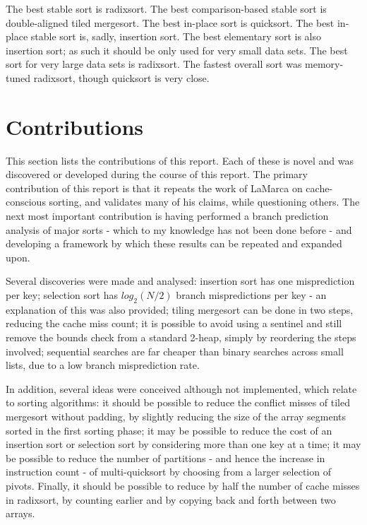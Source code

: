The best stable sort is radixsort. The best comparison-based stable sort is
double-aligned tiled mergesort. The best in-place sort is quicksort. The best in-place
stable sort is, sadly, insertion sort. The best elementary sort is also
insertion sort; as such it should be only used for very small data sets.  The
best sort for very large data sets is radixsort. The fastest overall sort was
memory-tuned radixsort, though quicksort is very close.

\section{Contributions}

This section lists the contributions of this report. Each of these is novel  
and was discovered or developed during the course of this report.
The primary contribution of this report is that it repeats the work of LaMarca
on cache-conscious sorting, and validates many of his claims, while questioning
others. The next most important contribution is having performed a branch
prediction analysis of major sorts - which to my knowledge has not been done
before - and developing a framework by which these results can be repeated and
expanded upon.


Several discoveries were made and analysed: insertion sort has one misprediction
per key; selection sort has $log_2(N/2)$ branch mispredictions per key - an
explanation of this was also provided; tiling mergesort can be done in two
steps, reducing the cache miss count; it is possible to avoid using a
sentinel and still remove the bounds check from a standard 2-heap, simply by
reordering the steps involved; sequential searches are far cheaper than binary
searches across small lists, due to a low branch misprediction rate.



In addition, several ideas were conceived although not implemented, which relate
to sorting algorithms: it should be possible to reduce the conflict misses of
tiled mergesort without padding, by slightly reducing the size of the array
segments sorted in the first sorting phase; it may be possible to reduce the
cost of an insertion sort or selection sort by considering more than one key at
a time; it may be possible to reduce the number of partitions - and hence the
increase in instruction count - of multi-quicksort by choosing from a larger
selection of pivots. Finally, it should be possible to reduce by half the number
of cache misses in radixsort, by counting earlier and by copying back and forth
between two arrays.
